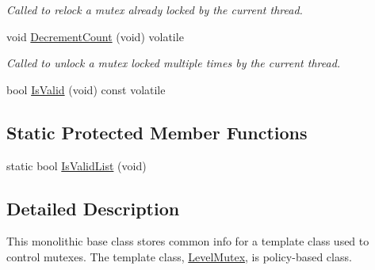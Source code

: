 \begin{DoxyCompactItemize}
\begin{DoxyCompactList}\small\item\em Called to relock a mutex already locked by the current thread. \end{DoxyCompactList}\item 
\hypertarget{classLoki_1_1LevelMutexInfo_a929c6964d78855d487a4fd72ef8e3332}{}void \hyperlink{classLoki_1_1LevelMutexInfo_a929c6964d78855d487a4fd72ef8e3332}{Decrement\+Count} (void) volatile\label{classLoki_1_1LevelMutexInfo_a929c6964d78855d487a4fd72ef8e3332}

\begin{DoxyCompactList}\small\item\em Called to unlock a mutex locked multiple times by the current thread. \end{DoxyCompactList}\item 
bool \hyperlink{classLoki_1_1LevelMutexInfo_a479a20cf2f8da0ef5bed07cdef45b119}{Is\+Valid} (void) const  volatile
\end{DoxyCompactItemize}
\subsection*{Static Protected Member Functions}
\begin{DoxyCompactItemize}
\item 
static bool \hyperlink{classLoki_1_1LevelMutexInfo_a01f6dfba5d2ea5606109b34e5a543cf0}{Is\+Valid\+List} (void)
\end{DoxyCompactItemize}


\subsection{Detailed Description}
This monolithic base class stores common info for a template class used to control mutexes. The template class, \hyperlink{classLoki_1_1LevelMutex}{Level\+Mutex}, is policy-\/based class.

